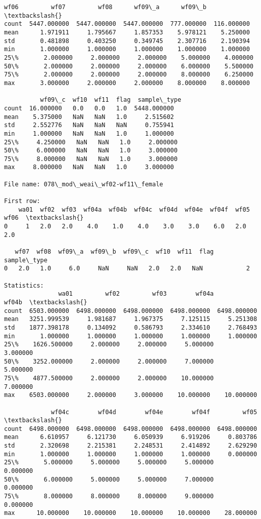 \documentclass[11pt]{article}
\begin{document}
\begin{Verbatim}[commandchars=\\\{\}]
              wf06         wf07         wf08      wf09\_a      wf09\_b  \textbackslash{}
count  5447.000000  5447.000000  5447.000000  777.000000  116.000000   
mean      1.971911     1.795667     1.857353    5.978121    5.250000   
std       0.481898     0.403250     0.349745    2.307716    2.190394   
min       1.000000     1.000000     1.000000    1.000000    1.000000   
25\%       2.000000     2.000000     2.000000    5.000000    4.000000   
50\%       2.000000     2.000000     2.000000    6.000000    5.500000   
75\%       2.000000     2.000000     2.000000    8.000000    6.250000   
max       3.000000     2.000000     2.000000    8.000000    8.000000   

          wf09\_c  wf10  wf11  flag  sample\_type  
count  16.000000   0.0   0.0   1.0  5448.000000  
mean    5.375000   NaN   NaN   1.0     2.515602  
std     2.552776   NaN   NaN   NaN     0.755941  
min     1.000000   NaN   NaN   1.0     1.000000  
25\%     4.250000   NaN   NaN   1.0     2.000000  
50\%     6.000000   NaN   NaN   1.0     3.000000  
75\%     8.000000   NaN   NaN   1.0     3.000000  
max     8.000000   NaN   NaN   1.0     3.000000  

File name: 078\_mod\_weai\_wf02-wf11\_female

First row: 
    wa01  wf02  wf03  wf04a  wf04b  wf04c  wf04d  wf04e  wf04f  wf05  wf06  \textbackslash{}
0     1   2.0   2.0    4.0    1.0    4.0    3.0    3.0    6.0   2.0   2.0   

   wf07  wf08  wf09\_a  wf09\_b  wf09\_c  wf10  wf11  flag  sample\_type  
0   2.0   1.0     6.0     NaN     NaN   2.0   2.0   NaN            2  

Statistics: 
               wa01         wf02         wf03        wf04a        wf04b  \textbackslash{}
count  6503.000000  6498.000000  6498.000000  6498.000000  6498.000000   
mean   3251.999539     1.981687     1.967375     7.125115     5.251308   
std    1877.398178     0.134092     0.586793     2.334610     2.768493   
min       1.000000     1.000000     1.000000     1.000000     1.000000   
25\%    1626.500000     2.000000     2.000000     5.000000     3.000000   
50\%    3252.000000     2.000000     2.000000     7.000000     5.000000   
75\%    4877.500000     2.000000     2.000000    10.000000     7.000000   
max    6503.000000     2.000000     3.000000    10.000000    10.000000   

             wf04c        wf04d        wf04e        wf04f         wf05  \textbackslash{}
count  6498.000000  6498.000000  6498.000000  6498.000000  6498.000000   
mean      6.610957     6.121730     6.050939     6.919206     0.803786   
std       2.320698     2.215381     2.248531     2.414892     2.629290   
min       1.000000     1.000000     1.000000     1.000000     0.000000   
25\%       5.000000     5.000000     5.000000     5.000000     0.000000   
50\%       6.000000     5.000000     5.000000     7.000000     0.000000   
75\%       8.000000     8.000000     8.000000     9.000000     0.000000   
max      10.000000    10.000000    10.000000    10.000000    28.000000   


\end{Verbatim}
\end{document}

